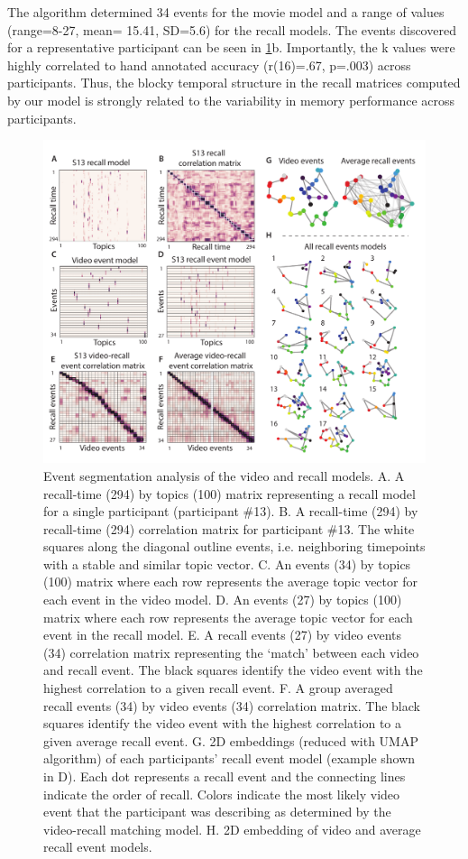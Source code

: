 \documentclass[a4paper,man,natbib,floatsintext]{apa6}
\begin{document}

The algorithm determined 34 events for the movie model and a range of values (range=8-27, mean= 15.41, SD=5.6) for the recall models.  The events discovered for a representative participant can be seen in \ref{fig:eventseg}b. Importantly, the k values were highly correlated to hand annotated accuracy (r(16)=.67, p=.003) across participants. Thus, the blocky temporal structure in the recall matrices computed by our model is strongly related to the variability in memory performance across participants.

\begin{figure}[t!]
\centering
\includegraphics[width=.75\textwidth]{figs/2_eventseg.pdf}
\caption{\label{fig:eventseg} Event segmentation analysis of the video and recall models. A. A recall-time (294) by topics (100) matrix representing a recall model for a single participant (participant \#13).  B. A recall-time (294) by recall-time (294) correlation matrix for participant \#13. The white squares along the diagonal outline events, i.e. neighboring timepoints with a stable and similar topic vector. C. An events (34) by topics (100) matrix where each row represents the average topic vector for each event in the video model.  D. An events (27) by topics (100) matrix where each row represents the average topic vector for each event in the recall model. E. A recall events (27) by video events (34) correlation matrix representing the `match' between each video and recall event. The black squares identify the video event with the highest correlation to a given recall event. F. A group averaged recall events (34) by video events (34) correlation matrix.  The black squares identify the video event with the highest correlation to a given average recall event. G. 2D embeddings (reduced with UMAP algorithm) of each participants' recall event model (example shown in D). Each dot represents a recall event and the connecting lines indicate the order of recall. Colors indicate the most likely video event that the participant was describing as determined by the video-recall matching model.  H. 2D embedding of video and average recall event models.  }
\end{figure}
\end{document}

